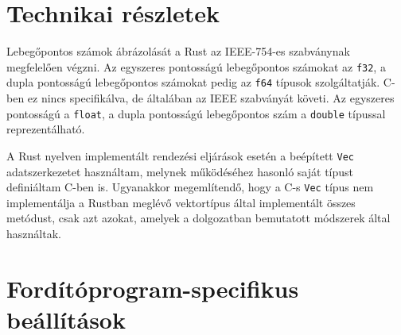 \section{Technikai részletek}
Lebegőpontos számok ábrázolását a Rust az IEEE-754-es szabványnak megfelelően végzni. Az egyszeres pontosságú lebegőpontos számokat az \lstinline{f32}, a dupla pontosságú lebegőpontos számokat pedig az \lstinline{f64} típusok szolgáltatják. C-ben ez nincs specifikálva, de általában az IEEE szabványát követi. Az egyszeres pontosságú a \lstinline{float}, a dupla pontosságú lebegőpontos szám a \lstinline{double} típussal reprezentálható.

A Rust nyelven implementált rendezési eljárások esetén a beépített \lstinline{Vec} adatszerkezetet használtam, melynek működéséhez hasonló saját típust definiáltam C-ben is. Ugyanakkor megemlítendő, hogy a C-s \lstinline{Vec} típus nem implementálja a Rustban meglévő vektortípus által implementált összes metódust, csak azt azokat, amelyek a dolgozatban bemutatott módszerek által használtak.

\section{Fordítóprogram-specifikus beállítások}
